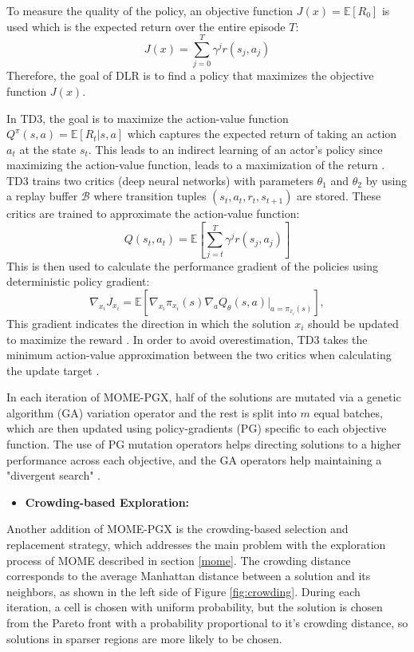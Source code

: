 \documentclass[12pt]{article}
\begin{document}
To measure the quality of the policy, an objective function $J(x)=\mathbb{E}[R_0]$ is used which is the expected return over the entire episode $T$:
\begin{equation}
\label{eq:obj}
J(x)=\sum_{j=0}^{T} \gamma^{j}r(s_{j}, a_{j})
\end{equation}
Therefore, the goal of DLR is to find a policy that maximizes the objective function $J(x)$. 

In TD3, the goal is to maximize the action-value function $Q^\pi(s, a)=\mathbb{E}[R_t|s,a]$ which captures the expected return of taking an action $a_{t}$ at the state $s_{t}$. This leads to an indirect learning of an actor's policy since maximizing the action-value function, leads to a maximization of the return \citep{nilsson2021policy}. TD3 trains two critics (deep neural networks) with parameters $\theta_1$ and $\theta_2$ by using a replay buffer $\mathcal{B}$ where transition tuples $(s_{t}, a_{t}, r_{t}, s_{t+1})$ are stored. These critics are trained to approximate the action-value function:
\begin{equation}
\label{eq:av}
Q(s_{t}, a_{t})=\mathbb{E}\left[ \sum_{j=t}^{T} \gamma^{j}r(s_{j}, a_{j})\right]
\end{equation}
This is then used to calculate the performance gradient of the policies using deterministic policy gradient:
\begin{equation}
\label{eq:pg}
\nabla_{x_{i}}J_{x_{i}}=\mathbb{E}\left[ \nabla_{x_{i}}\pi_{x_{i}}(s)\nabla_{a}Q_{\theta}(s, a)|_{a=\pi_{x_{i}}(s)}\right],
\end{equation}
This gradient indicates the direction in which the solution $x_i$ should be updated to maximize the reward \citep{janmohamed2023improving}. In order to avoid overestimation, TD3 takes the minimum action-value approximation between the two critics when calculating the update target  \citep{nilsson2021policy}. 

In each iteration of MOME-PGX, half of the solutions are mutated via a genetic algorithm (GA) variation operator and the rest is split into $m$ equal batches, which are then updated using policy-gradients (PG) specific to each objective function. The use of PG mutation operators helps directing solutions to a higher performance across each objective, and the GA operators help maintaining a "divergent search" \citep{janmohamed2023improving}.

\begin{itemize}
\item \textbf{Crowding-based Exploration:} 
\end{itemize}
Another addition of MOME-PGX is the crowding-based selection and replacement strategy, which addresses the main problem with the exploration process of MOME described in section \ref{mome}. The crowding distance corresponds to the average Manhattan distance between a solution and its neighbors, as shown in the left side of Figure \ref{fig:crowding}. During each iteration, a cell is chosen with uniform probability, but the solution is chosen from the Pareto front with a probability proportional to it's crowding distance, so solutions in sparser regions are more likely to be chosen. 
\end{document}
